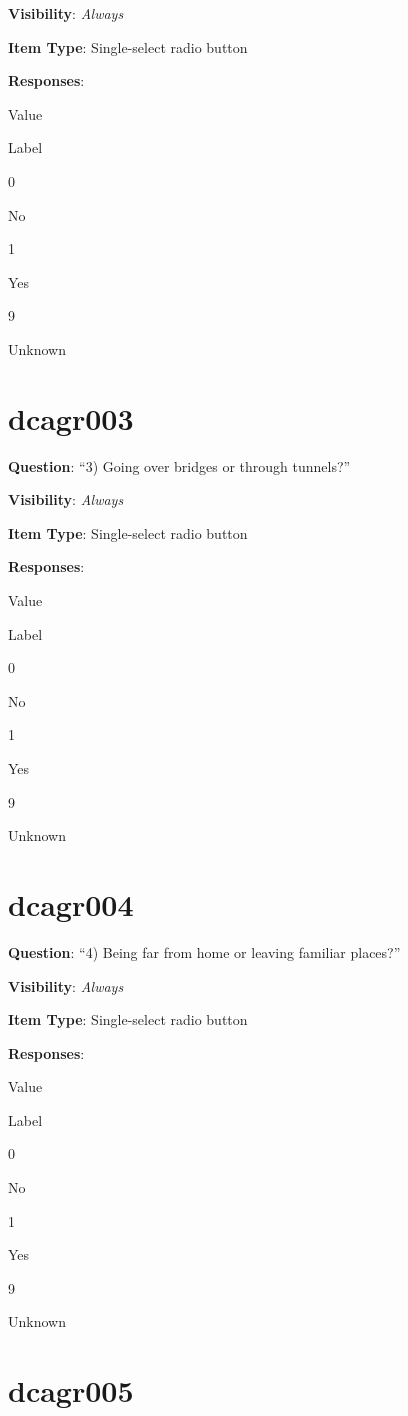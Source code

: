 \documentclass[]{book}
\begin{document}
\textbf{Visibility}: \emph{Always}

\textbf{Item Type}: Single-select radio button

\textbf{Responses}:

Value

Label

0

No

1

Yes

9

Unknown

\hypertarget{dcagr003}{%
\section{dcagr003}\label{dcagr003}}

\textbf{Question}: ``3) Going over bridges or through tunnels?''

\textbf{Visibility}: \emph{Always}

\textbf{Item Type}: Single-select radio button

\textbf{Responses}:

Value

Label

0

No

1

Yes

9

Unknown

\hypertarget{dcagr004}{%
\section{dcagr004}\label{dcagr004}}

\textbf{Question}: ``4) Being far from home or leaving familiar places?''

\textbf{Visibility}: \emph{Always}

\textbf{Item Type}: Single-select radio button

\textbf{Responses}:

Value

Label

0

No

1

Yes

9

Unknown

\hypertarget{dcagr005}{%
\section{dcagr005}\label{dcagr005}}
\end{document}
